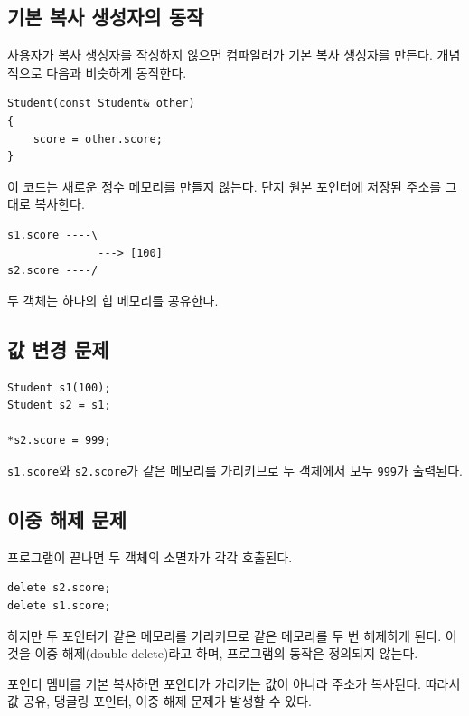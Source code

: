 \documentclass[11pt,a4paper]{article}
\begin{document}
\subsection{기본 복사 생성자의 동작}
사용자가 복사 생성자를 작성하지 않으면 컴파일러가 기본 복사 생성자를 만든다. 개념적으로 다음과 비슷하게 동작한다.

\begin{lstlisting}
Student(const Student& other)
{
    score = other.score;
}
\end{lstlisting}

이 코드는 새로운 정수 메모리를 만들지 않는다. 단지 원본 포인터에 저장된 주소를 그대로 복사한다.

\begin{verbatim}
s1.score ----\
              ---> [100]
s2.score ----/
\end{verbatim}

두 객체는 하나의 힙 메모리를 공유한다.

\subsection{값 변경 문제}
\begin{lstlisting}
Student s1(100);
Student s2 = s1;

*s2.score = 999;
\end{lstlisting}

\texttt{s1.score}와 \texttt{s2.score}가 같은 메모리를 가리키므로 두 객체에서 모두 \texttt{999}가 출력된다.

\subsection{이중 해제 문제}
프로그램이 끝나면 두 객체의 소멸자가 각각 호출된다.

\begin{lstlisting}
delete s2.score;
delete s1.score;
\end{lstlisting}

하지만 두 포인터가 같은 메모리를 가리키므로 같은 메모리를 두 번 해제하게 된다. 이것을 이중 해제(double delete)라고 하며, 프로그램의 동작은 정의되지 않는다.

\begin{importantbox}
포인터 멤버를 기본 복사하면 포인터가 가리키는 값이 아니라 주소가 복사된다. 따라서 값 공유, 댕글링 포인터, 이중 해제 문제가 발생할 수 있다.
\end{importantbox}
\end{document}
